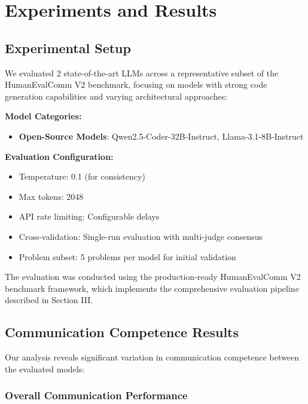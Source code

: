\documentclass[conference]{IEEEtran}
\begin{document}
\section{Experiments and Results}

\subsection{Experimental Setup}

We evaluated 2 state-of-the-art LLMs across a representative subset of the HumanEvalComm V2 benchmark, focusing on models with strong code generation capabilities and varying architectural approaches:

\textbf{Model Categories:}

\begin{itemize}
    \item \textbf{Open-Source Models}: Qwen2.5-Coder-32B-Instruct, Llama-3.1-8B-Instruct
\end{itemize}

\textbf{Evaluation Configuration:}

\begin{itemize}
    \item Temperature: 0.1 (for consistency)
    \item Max tokens: 2048
    \item API rate limiting: Configurable delays
    \item Cross-validation: Single-run evaluation with multi-judge consensus
    \item Problem subset: 5 problems per model for initial validation
\end{itemize}

The evaluation was conducted using the production-ready HumanEvalComm V2 benchmark framework, which implements the comprehensive evaluation pipeline described in Section III.

\subsection{Communication Competence Results}

Our analysis reveals significant variation in communication competence between the evaluated models:

\subsubsection{Overall Communication Performance}
\end{document}
